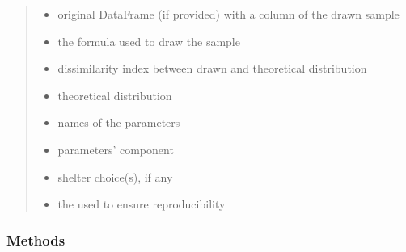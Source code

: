 \documentclass[letterpaper,10pt,english]{sphinxmanual}
\begin{document}
\begin{fulllineitems}
\begin{quote}
\begin{description}
\begin{itemize}
\item {} 
\sphinxAtStartPar
{} \textendash{} original DataFrame (if provided) with a column of the drawn sample

\item {} 
\sphinxAtStartPar
{} \textendash{} the formula used to draw the sample

\item {} 
\sphinxAtStartPar
{} \textendash{} dissimilarity index between drawn and theoretical distribution

\item {} 
\sphinxAtStartPar
{} \textendash{} theoretical distribution

\item {} 
\sphinxAtStartPar
{} \textendash{} names of the parameters

\item {} 
\sphinxAtStartPar
{} \textendash{} parameters’ component

\item {} 
\sphinxAtStartPar
{} \textendash{} shelter choice(s), if any

\item {} 
\sphinxAtStartPar
{} \textendash{} the  used to ensure reproducibility

\end{itemize}

\end{description}\end{quote}
\subsubsection*{Methods}



\end{fulllineitems}
\end{document}

